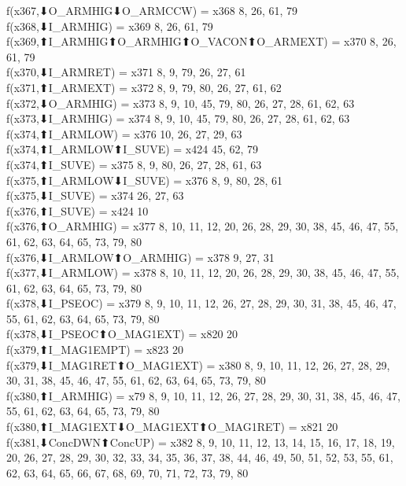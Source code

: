 f(x367,⬇O_ARMHIG⬇O_ARMCCW) = x368 {8, 26, 61, 79} \\
f(x368,⬇I_ARMHIG) = x369 {8, 26, 61, 79} \\
f(x369,⬆I_ARMHIG⬆O_ARMHIG⬆O_VACON⬆O_ARMEXT) = x370 {8, 26, 61, 79} \\
f(x370,⬇I_ARMRET) = x371 {8, 9, 79, 26, 27, 61} \\
f(x371,⬆I_ARMEXT) = x372 {8, 9, 79, 80, 26, 27, 61, 62} \\
f(x372,⬇O_ARMHIG) = x373 {8, 9, 10, 45, 79, 80, 26, 27, 28, 61, 62, 63} \\
f(x373,⬇I_ARMHIG) = x374 {8, 9, 10, 45, 79, 80, 26, 27, 28, 61, 62, 63} \\
f(x374,⬆I_ARMLOW) = x376 {10, 26, 27, 29, 63} \\
f(x374,⬆I_ARMLOW⬆I_SUVE) = x424 {45, 62, 79} \\
f(x374,⬆I_SUVE) = x375 {8, 9, 80, 26, 27, 28, 61, 63} \\
f(x375,⬆I_ARMLOW⬇I_SUVE) = x376 {8, 9, 80, 28, 61} \\
f(x375,⬇I_SUVE) = x374 {26, 27, 63} \\
f(x376,⬆I_SUVE) = x424 {10} \\
f(x376,⬆O_ARMHIG) = x377 {8, 10, 11, 12, 20, 26, 28, 29, 30, 38, 45, 46, 47, 55, 61, 62, 63, 64, 65, 73, 79, 80} \\
f(x376,⬇I_ARMLOW⬆O_ARMHIG) = x378 {9, 27, 31} \\
f(x377,⬇I_ARMLOW) = x378 {8, 10, 11, 12, 20, 26, 28, 29, 30, 38, 45, 46, 47, 55, 61, 62, 63, 64, 65, 73, 79, 80} \\
f(x378,⬇I_PSEOC) = x379 {8, 9, 10, 11, 12, 26, 27, 28, 29, 30, 31, 38, 45, 46, 47, 55, 61, 62, 63, 64, 65, 73, 79, 80} \\
f(x378,⬇I_PSEOC⬆O_MAG1EXT) = x820 {20} \\
f(x379,⬆I_MAG1EMPT) = x823 {20} \\
f(x379,⬇I_MAG1RET⬆O_MAG1EXT) = x380 {8, 9, 10, 11, 12, 26, 27, 28, 29, 30, 31, 38, 45, 46, 47, 55, 61, 62, 63, 64, 65, 73, 79, 80} \\
f(x380,⬆I_ARMHIG) = x79 {8, 9, 10, 11, 12, 26, 27, 28, 29, 30, 31, 38, 45, 46, 47, 55, 61, 62, 63, 64, 65, 73, 79, 80} \\
f(x380,⬆I_MAG1EXT⬇O_MAG1EXT⬆O_MAG1RET) = x821 {20} \\
f(x381,⬇ConcDWN⬆ConcUP) = x382 {8, 9, 10, 11, 12, 13, 14, 15, 16, 17, 18, 19, 20, 26, 27, 28, 29, 30, 32, 33, 34, 35, 36, 37, 38, 44, 46, 49, 50, 51, 52, 53, 55, 61, 62, 63, 64, 65, 66, 67, 68, 69, 70, 71, 72, 73, 79, 80} \\
